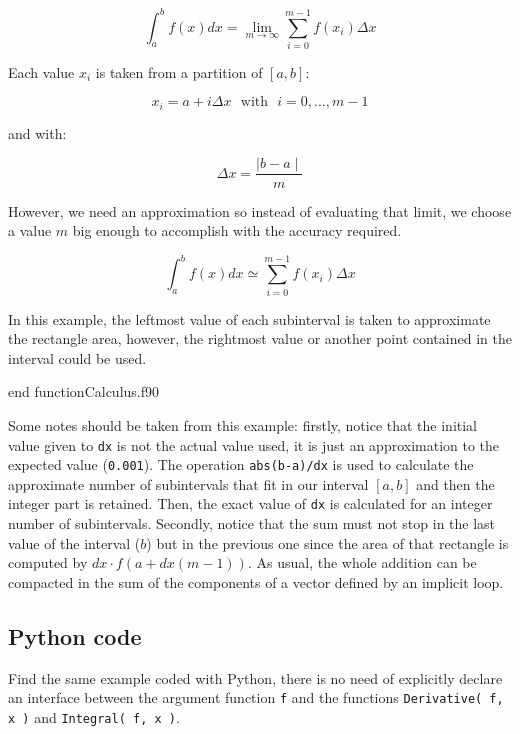 $$ 
\int_{a}^{b}f(x)dx   =   \lim_{m\rightarrow \infty}\sum_{i=0}^{m-1}f(x_i) \Delta x
$$

Each value $x_i$ is taken from a partition of $[a,b]$:

$$
x_i = a + i\Delta x \ \ \    \text{with} \ \ \  i = 0, ..., m-1
$$ 

and with:

$$
\Delta x = \frac{\mid b-a\mid}{m}
$$

However, we need an approximation so instead of evaluating that limit, we choose a value $m$ big enough to accomplish with the accuracy required. 

$$ 
\int_{a}^{b}f(x)dx   \simeq \sum_{i=0}^{m-1}f(x_i) \Delta x
$$

In this example, the leftmost value of each subinterval is taken to approximate the rectangle area, however, the rightmost value or another point contained in the interval could be used. 


\vspace{0.5cm}
{end function}{Calculus.f90}

Some notes should be taken from this example: firstly, notice that the initial value given to \texttt{dx} is not the actual value used, it is just an approximation to the expected value  (\texttt{0.001}). The operation \texttt{abs(b-a)/dx} is used to calculate the approximate number of subintervals that fit in our interval $[a,b]$ and then the integer part is retained. Then, the exact value of  \texttt{dx} is calculated for an integer number of subintervals. Secondly, notice that the sum must not stop in the last value of the interval ($b$) but in the previous one since the area of that rectangle is computed by $dx\cdot f(a+dx(m-1))$. As usual, the whole addition can be compacted in the sum of the components of a vector defined by an implicit loop. 


\newpage 
\subsection*{Python code} 
Find the same example coded with Python, there is no need of explicitly declare an interface between the argument function \texttt{f} and the functions \texttt{Derivative( f, x )} and \texttt{Integral( f, x )}. 
\renewcommand{\home}{./Python/sources/Foundations/Calculus}

